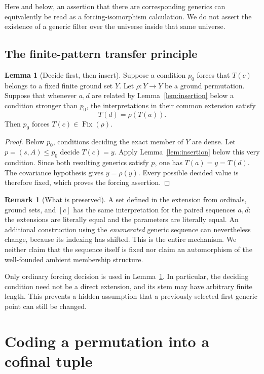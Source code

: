 \documentclass[11pt,letterpaper]{article}
\theoremstyle{definition}
\newtheorem{lemma}[definition]{Lemma}
\newtheorem{remark}[definition]{Remark}
\numberwithin{equation}{section}
\newcommand{\Fix}{\operatorname{Fix}}
\begin{document}
Here and below, an assertion that there are corresponding generics can equivalently be read as a forcing-isomorphism calculation. We do not assert the existence of a generic filter over the universe inside that same universe.

\subsection{The finite-pattern transfer principle}

\begin{lemma}[Decide first, then insert]\label{lem:transfer}
Suppose a condition $p_0$ forces that $T(c)$ belongs to a fixed finite ground set $Y$. Let $\rho:Y\to Y$ be a ground permutation. Suppose that whenever $a,d$ are related by Lemma~\ref{lem:insertion} below a condition stronger than $p_0$, the interpretations in their common extension satisfy
\[
 T(d)=\rho(T(a)).
\]
Then $p_0$ forces $T(c)\in\Fix(\rho)$.
\end{lemma}
\begin{proof}
Below $p_0$, conditions deciding the exact member of $Y$ are dense. Let $p=(s,A)\leq p_0$ decide $T(c)=y$. Apply Lemma~\ref{lem:insertion} below this very condition. Since both resulting generics satisfy $p$, one has $T(a)=y=T(d)$. The covariance hypothesis gives $y=\rho(y)$. Every possible decided value is therefore fixed, which proves the forcing assertion.
\end{proof}

\begin{remark}[What is preserved]\label{rem:preserve}
A set defined in the extension from ordinals, ground sets, and $[c]$ has the same interpretation for the paired sequences $a,d$: the extensions are literally equal and the parameters are literally equal. An additional construction using the \emph{enumerated} generic sequence can nevertheless change, because its indexing has shifted. This is the entire mechanism. We neither claim that the sequence itself is fixed nor claim an automorphism of the well-founded ambient membership structure.
\end{remark}

Only ordinary forcing decision is used in Lemma~\ref{lem:transfer}. In particular, the deciding condition need not be a direct extension, and its stem may have arbitrary finite length. This prevents a hidden assumption that a previously selected first generic point can still be changed.

\section{Coding a permutation into a cofinal tuple}\label{sec:coding}
\end{document}
